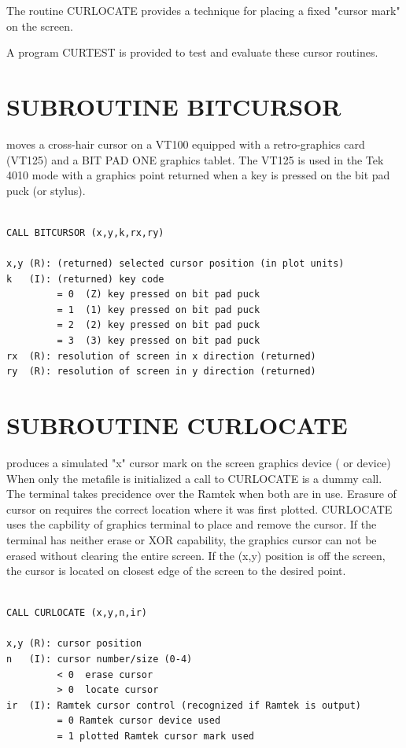 \documentclass[11pt]{report}
\begin{document}
The routine CURLOCATE provides
a technique for placing a fixed "cursor mark" on the screen.

A program CURTEST is provided to test and evaluate these cursor routines.

\section{SUBROUTINE BITCURSOR}

 moves a cross-hair cursor on a VT100 equipped with a retro-graphics
card (VT125) and a BIT PAD ONE graphics tablet.  The VT125 is used in the
Tek 4010 mode with a graphics point returned when a key is pressed on the
bit pad puck (or stylus).
\begin{verbatim}

CALL BITCURSOR (x,y,k,rx,ry)

x,y (R): (returned) selected cursor position (in plot units)
k   (I): (returned) key code
         = 0  (Z) key pressed on bit pad puck
         = 1  (1) key pressed on bit pad puck
         = 2  (2) key pressed on bit pad puck
         = 3  (3) key pressed on bit pad puck
rx  (R): resolution of screen in x direction (returned)
ry  (R): resolution of screen in y direction (returned)
\end{verbatim}

\section{SUBROUTINE CURLOCATE}

 produces a simulated "x" cursor mark on the screen graphics
device ( or  device) When only the metafile is
initialized a call to CURLOCATE is a dummy call.  The terminal takes
precidence over the Ramtek when both are in use.  Erasure of cursor on
requires the correct location where it was first plotted.  CURLOCATE
uses the  capbility of graphics terminal to place and remove
the cursor.  If the terminal has neither erase or XOR capability, the
graphics cursor can not be erased without clearing the entire screen.
If the (x,y) position is off the screen, the cursor is located on
closest edge of the screen to the desired point.
\begin{verbatim}

CALL CURLOCATE (x,y,n,ir)

x,y (R): cursor position
n   (I): cursor number/size (0-4)
         < 0  erase cursor
         > 0  locate cursor
ir  (I): Ramtek cursor control (recognized if Ramtek is output)
         = 0 Ramtek cursor device used
         = 1 plotted Ramtek cursor mark used
\end{verbatim}
\end{document}

